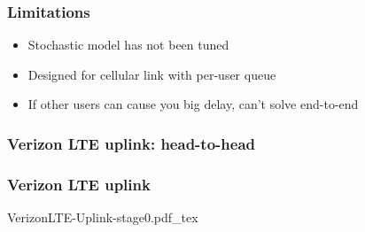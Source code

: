 \documentclass[svgnames]{beamer}
\begin{document}
\begin{frame}

\begin{centering}
\def\svgwidth{0.85 \columnwidth}

\end{centering}

\end{frame}

%
%
%
%
%
%
%
%

\begin{frame}
\frametitle{Limitations}

\begin{itemize}

\item Stochastic model has not been tuned

\item Designed for cellular link with per-user queue

\item If other users can cause you big delay, can't solve end-to-end

\end{itemize}

\end{frame}

\begin{frame}
\frametitle{Verizon LTE uplink: head-to-head}

\end{frame}

\begin{frame}
\frametitle{Verizon LTE uplink}
\vspace{-1 cm}
\def\svgwidth{\columnwidth}\footnotesize{VerizonLTE-Uplink-stage0.pdf_tex}
\end{frame}
\end{document}
